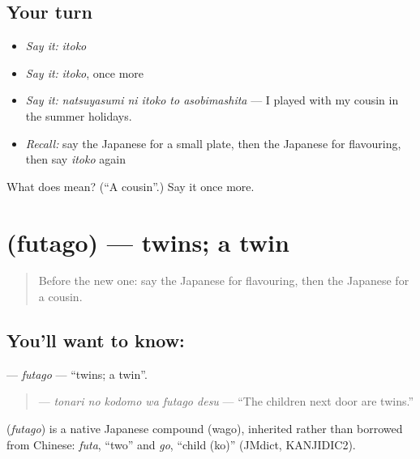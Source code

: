 \subsection*{Your turn}
\begin{itemize}
\raggedright
  \item \emph{Say it:} \emph{itoko}
  \item \emph{Say it:} \emph{itoko}, once more
  \item \emph{Say it:} \emph{natsuyasumi ni itoko to asobimashita} — I played with my cousin in the summer holidays.
  \item \emph{Recall:} say the Japanese for a small plate, then the Japanese for flavouring, then say \emph{itoko} again
\end{itemize}

\begin{tcolorbox}[breakable,colback=teal!4,colframe=teal!35!black,title={Before you move on}]
What does  mean? (\textquotedblleft{}A cousin\textquotedblright{}.) Say it once more.
\end{tcolorbox}
\section[\texorpdfstring{\ja{ふたご} (futago)}{ふたご (futago)}]{ (futago) — twins; a twin}

\label{lesson:JA-C476-futago}



\begin{quote}
Before the new one: say the Japanese for flavouring, then the Japanese for a cousin.
\end{quote}

\subsection*{You'll want to know: }
\textbf{} — \emph{futago} — \textquotedblleft{}twins; a twin\textquotedblright{}.

\begin{quote}
\textbf{  } — \emph{tonari no kodomo wa futago desu} — \textquotedblleft{}The children next door are twins.\textquotedblright{}
\end{quote}

\begin{cousinweb}
\textbf{} (\emph{futago}) is a native Japanese compound (wago), inherited rather than borrowed from Chinese: \emph{futa}, \textquotedblleft{}two\textquotedblright{} and \emph{go}, \textquotedblleft{}child (ko)\textquotedblright{} (JMdict, KANJIDIC2).
\end{cousinweb}

